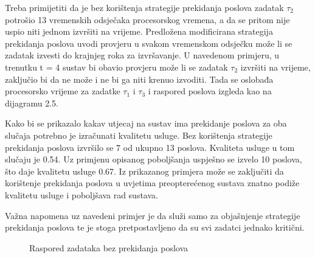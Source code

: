 \documentclass[../zavrsni.tex]{subfiles}
\begin{document}
Treba primijetiti da je bez korištenja strategije prekidanja poslova zadatak $\tau_2$ potrošio 13 vremenskih odsječaka procesorskog vremena, a 
da se pritom nije uspio niti jednom izvršiti na vrijeme.
Predložena modificirana strategija prekidanja poslova uvodi provjeru u svakom vremenskom odsječku može li se zadatak izvesti do  krajnjeg roka 
za izvršavanje. 
U navedenom primjeru, u 
trenutku t = 4 sustav bi obavio provjeru može li se zadatak $\tau_2$ izvršiti na vrijeme, zaključio bi da ne može i ne bi ga niti krenuo
izvoditi. Tada se oslobađa procesorsko vrijeme za zadatke $\tau_1$ i $\tau_3$ i
raspored poslova izgleda kao na dijagramu 2.5. 

Kako bi se prikazalo kakav utjecaj na sustav ima prekidanje poslova za oba slučaja potrebno je izračunati kvalitetu usluge.
Bez korištenja strategije prekidanja poslova
izvršilo se 7 od ukupno 13 poslova. Kvaliteta usluge u tom slučaju je 0.54. Uz primjenu opisanog poboljšanja uspješno se izvelo 10 
poslova, što daje kvalitetu usluge 0.67. Iz prikazanog primjera može se zaključiti da korištenje prekidanja poslova u uvjetima 
preopterećenog sustava znatno podiže kvalitetu usluge i poboljšava rad sustava.

Važna napomena uz navedeni primjer je da služi samo za objašnjenje strategije prekidanja poslova te je stoga 
pretpostavljeno da su svi zadatci jednako kritični.

\begin{figure}[h!]
  \centering

  \begin{RTGrid}[width=13cm]{3}{24}

  

  

  

  \end{RTGrid}

  \caption{Raspored zadataka bez prekidanja poslova}
  \label{fig:ex1}
\end{figure}
\end{document}
